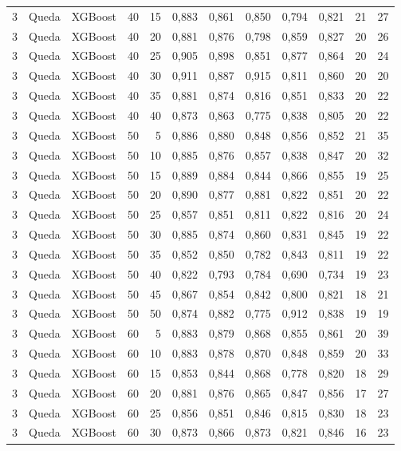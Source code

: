 \begin{longtable}{ccclrrrrrrrr}
3 & Queda & XGBoost & 40 & 15 & 0,883 & 0,861 & 0,850 & 0,794 & 0,821 & 21 & 27 \\
3 & Queda & XGBoost & 40 & 20 & 0,881 & 0,876 & 0,798 & 0,859 & 0,827 & 20 & 26 \\
3 & Queda & XGBoost & 40 & 25 & 0,905 & 0,898 & 0,851 & 0,877 & 0,864 & 20 & 24 \\
3 & Queda & XGBoost & 40 & 30 & 0,911 & 0,887 & 0,915 & 0,811 & 0,860 & 20 & 20 \\
3 & Queda & XGBoost & 40 & 35 & 0,881 & 0,874 & 0,816 & 0,851 & 0,833 & 20 & 22 \\
3 & Queda & XGBoost & 40 & 40 & 0,873 & 0,863 & 0,775 & 0,838 & 0,805 & 20 & 22 \\
3 & Queda & XGBoost & 50 & 5 & 0,886 & 0,880 & 0,848 & 0,856 & 0,852 & 21 & 35 \\
3 & Queda & XGBoost & 50 & 10 & 0,885 & 0,876 & 0,857 & 0,838 & 0,847 & 20 & 32 \\
3 & Queda & XGBoost & 50 & 15 & 0,889 & 0,884 & 0,844 & 0,866 & 0,855 & 19 & 25 \\
3 & Queda & XGBoost & 50 & 20 & 0,890 & 0,877 & 0,881 & 0,822 & 0,851 & 20 & 22 \\
3 & Queda & XGBoost & 50 & 25 & 0,857 & 0,851 & 0,811 & 0,822 & 0,816 & 20 & 24 \\
3 & Queda & XGBoost & 50 & 30 & 0,885 & 0,874 & 0,860 & 0,831 & 0,845 & 19 & 22 \\
3 & Queda & XGBoost & 50 & 35 & 0,852 & 0,850 & 0,782 & 0,843 & 0,811 & 19 & 22 \\
3 & Queda & XGBoost & 50 & 40 & 0,822 & 0,793 & 0,784 & 0,690 & 0,734 & 19 & 23 \\
3 & Queda & XGBoost & 50 & 45 & 0,867 & 0,854 & 0,842 & 0,800 & 0,821 & 18 & 21 \\
3 & Queda & XGBoost & 50 & 50 & 0,874 & 0,882 & 0,775 & 0,912 & 0,838 & 19 & 19 \\
3 & Queda & XGBoost & 60 & 5 & 0,883 & 0,879 & 0,868 & 0,855 & 0,861 & 20 & 39 \\
3 & Queda & XGBoost & 60 & 10 & 0,883 & 0,878 & 0,870 & 0,848 & 0,859 & 20 & 33 \\
3 & Queda & XGBoost & 60 & 15 & 0,853 & 0,844 & 0,868 & 0,778 & 0,820 & 18 & 29 \\
3 & Queda & XGBoost & 60 & 20 & 0,881 & 0,876 & 0,865 & 0,847 & 0,856 & 17 & 27 \\
3 & Queda & XGBoost & 60 & 25 & 0,856 & 0,851 & 0,846 & 0,815 & 0,830 & 18 & 23 \\
3 & Queda & XGBoost & 60 & 30 & 0,873 & 0,866 & 0,873 & 0,821 & 0,846 & 16 & 23 \\

\end{longtable}
